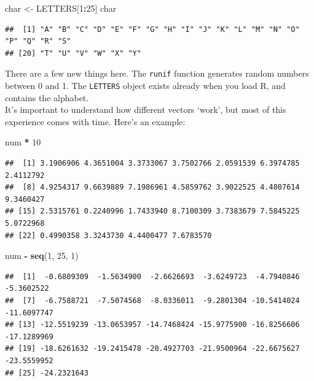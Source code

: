 \documentclass[
]{book}
\newenvironment{Shaded}{\begin{snugshade}}{\end{snugshade}}
\newcommand{\DecValTok}[1]{\textcolor[rgb]{0.00,0.00,0.81}{#1}}
\newcommand{\KeywordTok}[1]{\textcolor[rgb]{0.13,0.29,0.53}{\textbf{#1}}}
\newcommand{\NormalTok}[1]{#1}
\newcommand{\OperatorTok}[1]{\textcolor[rgb]{0.81,0.36,0.00}{\textbf{#1}}}
\newcommand{\StringTok}[1]{\textcolor[rgb]{0.31,0.60,0.02}{#1}}
\begin{document}
\begin{Shaded}
\begin{Highlighting}[]
\NormalTok{char <-}\StringTok{ }\NormalTok{LETTERS[}\DecValTok{1}\OperatorTok{:}\DecValTok{25}\NormalTok{]}
\NormalTok{char}
\end{Highlighting}
\end{Shaded}

\begin{verbatim}
##  [1] "A" "B" "C" "D" "E" "F" "G" "H" "I" "J" "K" "L" "M" "N" "O" "P" "Q" "R" "S"
## [20] "T" "U" "V" "W" "X" "Y"
\end{verbatim}

There are a few new things here. The \texttt{runif} function generates random numbers
between 0 and 1. The \texttt{LETTERS} object exists already when you load R, and
contains the alphabet.\\

It's important to understand how different vectors `work', but most of this
experience comes with time. Here's an example:

\begin{Shaded}
\begin{Highlighting}[]
\NormalTok{num }\OperatorTok{*}\StringTok{ }\DecValTok{10}
\end{Highlighting}
\end{Shaded}

\begin{verbatim}
##  [1] 3.1906906 4.3651004 3.3733067 3.7502766 2.0591539 6.3974785 2.4112792
##  [8] 4.9254317 9.6639889 7.1986961 4.5859762 3.9022525 4.4807614 9.3460427
## [15] 2.5315761 0.2240996 1.7433940 8.7100309 3.7383679 7.5845225 5.0722968
## [22] 0.4990358 3.3243730 4.4400477 7.6783570
\end{verbatim}

\begin{Shaded}
\begin{Highlighting}[]
\NormalTok{num }\OperatorTok{-}\StringTok{ }\KeywordTok{seq}\NormalTok{(}\DecValTok{1}\NormalTok{, }\DecValTok{25}\NormalTok{, }\DecValTok{1}\NormalTok{)}
\end{Highlighting}
\end{Shaded}

\begin{verbatim}
##  [1]  -0.6809309  -1.5634900  -2.6626693  -3.6249723  -4.7940846  -5.3602522
##  [7]  -6.7588721  -7.5074568  -8.0336011  -9.2801304 -10.5414024 -11.6097747
## [13] -12.5519239 -13.0653957 -14.7468424 -15.9775900 -16.8256606 -17.1289969
## [19] -18.6261632 -19.2415478 -20.4927703 -21.9500964 -22.6675627 -23.5559952
## [25] -24.2321643
\end{verbatim}
\end{document}
